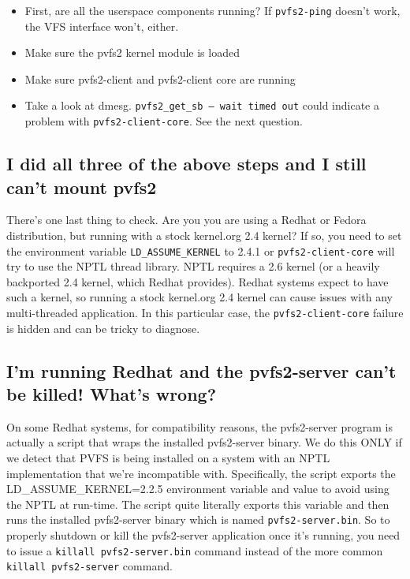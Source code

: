 \documentclass[11pt,letterpaper]{article}
\begin{document}
\begin{itemize}
\item First, are all the userspace components running?  If \texttt{pvfs2-ping}
doesn't work, the VFS interface won't, either.
\item Make sure the pvfs2 kernel module is loaded
\item Make sure pvfs2-client and pvfs2-client core are running
\item Take a look at dmesg.  \texttt{pvfs2\_get\_sb -- wait timed out} could
      indicate a problem with \texttt{pvfs2-client-core}.  See the next
      question.
\end{itemize}

\subsection{I did all three of the above steps and I still can't mount pvfs2}
\label{sec:nptl_and_mounting}

There's one last thing to check.  Are you you are using a Redhat or Fedora
distribution, but running with a stock kernel.org 2.4 kernel?  If so, you need
to set the environment variable \texttt{LD\_ASSUME\_KERNEL} to 2.4.1 or
\texttt{pvfs2-client-core} will try to use the NPTL thread library.  NPTL
requires a 2.6 kernel (or a heavily backported 2.4 kernel, which Redhat
provides).  Redhat systems expect to have such a kernel, so running a stock
kernel.org 2.4 kernel can cause issues with any multi-threaded application.  In
this particular case, the \texttt{pvfs2-client-core} failure is hidden and can
be tricky to diagnose. 

\subsection{I'm running Redhat and the pvfs2-server can't be killed! What's wrong?}

On some Redhat systems, for compatibility reasons, the pvfs2-server
program is actually a script that wraps the installed pvfs2-server
binary.  We do this ONLY if we detect that PVFS is being installed on
a system with an NPTL implementation that we're incompatible with.
Specifically, the script exports the LD\_ASSUME\_KERNEL=2.2.5
environment variable and value to avoid using the NPTL at run-time.
The script quite literally exports this variable and then runs the
installed pvfs2-server binary which is named
\texttt{pvfs2-server.bin}.  So to properly shutdown or kill the
pvfs2-server application once it's running, you need to issue a
\texttt{killall pvfs2-server.bin} command instead of the more common
\texttt{killall pvfs2-server} command.
\end{document}
